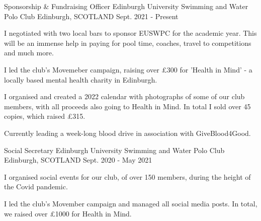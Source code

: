 

\begin{cventries}
  \cventry
    {Sponsorship \& Fundraising Officer} %
    {Edinburgh University Swimming and Water Polo Club} %
    {Edinburgh, SCOTLAND} %
    {Sept. 2021 - Present} %
    {
      \begin{cvitems} %
        \item I negotiated with two local bars to sponsor EUSWPC for the academic year. This will be an immense help in paying for pool time, coaches, travel to competitions and much more.
        \item I led the club's Movemeber campaign, raising over £300 for 'Health in Mind' - a locally based mental health charity in Edinburgh.
        \item I organised and created a 2022 calendar with photographs of some of our club members, with all proceeds also going to Health in Mind. In total I sold over 45 copies, which raised £315.
        \item Currently leading a week-long blood drive in association with GiveBlood4Good.
      \end{cvitems}
    }
    \vspace{.08cm}
    
  \cventry
    {Social Secretary} %
    {Edinburgh University Swimming and Water Polo Club} %
    {Edinburgh, SCOTLAND} %
    {Sept. 2020 - May 2021} %
    {
      \begin{cvitems} %
        \item I organised social events for our club, of over 150 members, during the height of the Covid pandemic.
        \item I led the club's Movember campaign and managed all social media posts. In total, we raised over £1000 for Health in Mind.
      \end{cvitems}
    }
    \vspace{.08cm}
    

\end{cventries}

